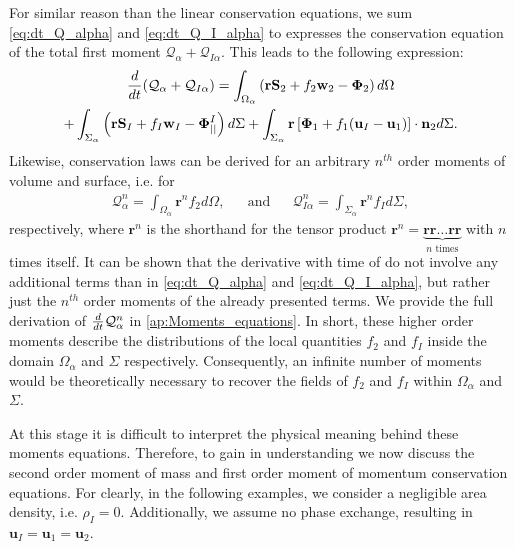 For similar reason than the linear conservation equations, we sum \ref{eq:dt_Q_alpha} and \ref{eq:dt_Q_I_alpha} to expresses the conservation equation of the total first moment $\mathcal{Q}_\alpha + \mathcal{Q}_{I\alpha}$.
This leads to the following expression:
\begin{multline}
    \frac{d}{d t} (\mathcal{Q}_\alpha+\mathcal{Q}_{I\alpha})
    = \int_{\Omega_\alpha} \left(
        \textbf{r} \textbf{S}_2         
        + f_2  \textbf{w}_2 
        - \mathbf{\Phi}_2
    \right) d\Omega\\
    + \int_{\Sigma_\alpha} \left(
        \textbf{r}\textbf{S}_I
        + f_I \textbf{w}_I
        - \mathbf{\Phi}_{||}^I
    \right) d\Sigma
    + \int_{\Sigma_\alpha} \textbf{r} \left[
        \mathbf{\Phi}_1
        + f_1 (\textbf{u}_I-\textbf{u}_1)
    \right]\cdot \textbf{n}_2  d\Sigma.
    \label{eq:dt_Q_alpha_tot}
\end{multline}
Likewise, conservation laws can be derived for an arbitrary $n^{th}$ order moments of volume and surface, i.e. for
\begin{align}
    \mathcal{Q}_\alpha^n
    = \int_{\Omega_\alpha}
        \textbf{r}^n
        f_2 d\Omega,
        && \text{and} &&
    \mathcal{Q}_{I\alpha}^n
    = \int_{\Sigma_\alpha}
        \textbf{r}^n
    f_I d\Sigma,
    \label{eq:Q_n_definition}
\end{align} 
respectively, where $\textbf{r}^n$ is the shorthand for the tensor product $\textbf{r}^n = \underbrace{\textbf{rr}\ldots \textbf{rr}}_{n\text{ times}} $ with $n$ times itself. 
It can be shown that the derivative with time of do not involve any additional terms than in \ref{eq:dt_Q_alpha} and \ref{eq:dt_Q_I_alpha}, but rather just the $n^{th}$ order moments of the already presented terms.
We provide the full derivation of $\frac{d}{d t} \mathcal{Q}_\alpha^n$ in \ref{ap:Moments_equations}.
In short, these higher order moments describe the distributions of the local quantities $f_2$ and $f_I$ inside the domain $\Omega_\alpha$ and $\Sigma$ respectively.
Consequently, an infinite number of moments would be theoretically necessary to recover the fields of $f_2$ and $f_I$  within $\Omega_\alpha$ and $\Sigma$. 


At this stage it is difficult to interpret the physical meaning behind these moments equations. 
Therefore, to gain in understanding we now discuss the second order moment of mass and first order moment of momentum conservation equations. 
For clearly, in the following examples, we consider a negligible area density, i.e. $\rho_I=0$. 
Additionally, we assume no phase exchange, resulting in $\textbf{u}_I=\textbf{u}_1=\textbf{u}_2$. 

